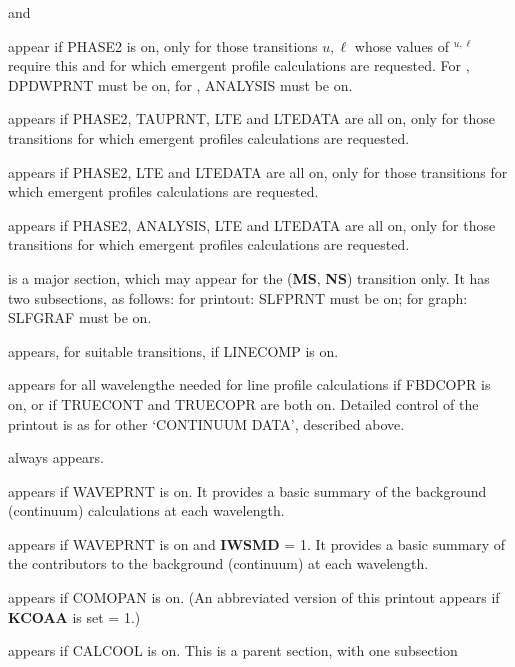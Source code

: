 {} and  \par
appear if PHASE2 is on, only for those transitions $u,\ell$
whose values of $^{u,\ell}$ require this
and for which emergent profile calculations are \break requested. 
For , DPDWPRNT must be on, for
, ANALYSIS must be on.
\blankline
{} \par
appears if PHASE2, TAUPRNT, LTE and LTEDATA are all
on, only for those transitions for which emergent profiles calculations
are requested.
\blankline
{} \par
appears if PHASE2, LTE and LTEDATA are all
on, only for those transitions for which emergent profiles calculations
are requested.
\blankline
{} \par
appears if PHASE2, ANALYSIS, LTE and LTEDATA are all
on, only for those transitions for which emergent profiles calculations
are requested.
\blankline
{} \par
is a major section, which may appear for the ({\bf MS}, {\bf NS})
transition only. It has two subsections, as follows:
\bull for printout: SLFPRNT must be on;
\bull for graph: SLFGRAF must be on.
\blankline
{} \par
appears, for suitable transitions, if LINECOMP is on.
\blankline
{} \par
appears for all wavelengthe needed for line profile calculations
if FBDCOPR is on, or if TRUECONT and TRUECOPR are both on. Detailed
control of the printout is as for other `CONTINUUM DATA', described above.
\ej
{} \par
always appears.
\blankline
{} \par
appears if WAVEPRNT is on. It provides a basic summary of the background
(continuum) calculations at each wavelength.
\blankline
{} \par
appears if WAVEPRNT is on and {\bf IWSMD} = 1. It provides a basic
summary of the contributors to the background (continuum) at each
wavelength.
\blankline
{} \par
appears if COMOPAN is on. (An abbreviated version of this printout
appears if {\bf KCOAA} is set = 1.)
\blankline
{} \par
appears if CALCOOL is on. This is a parent section, with one subsection
